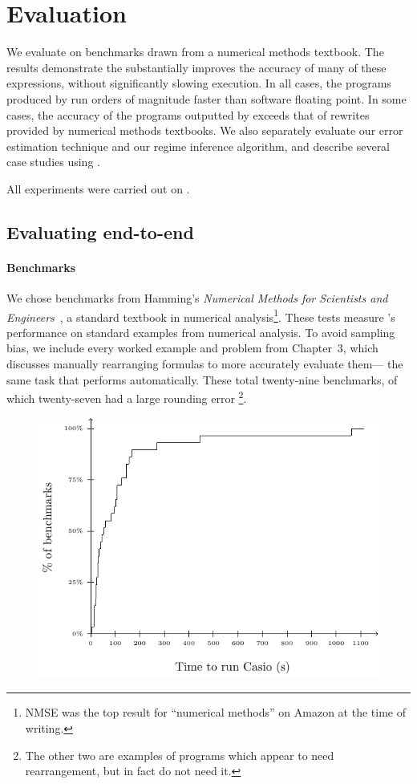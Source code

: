 \documentclass[paper.tex]{subfiles}
\begin{document}
\section{Evaluation}
\label{sec:evaluation}

We evaluate \casio on benchmarks drawn from a numerical methods
textbook.  The results demonstrate the \casio substantially improves
the accuracy of many of these expressions, without significantly
slowing execution.  In all cases, the programs produced by \casio run
orders of magnitude faster than software floating point.  In some
cases, the accuracy of the programs outputted by \casio exceeds that
of rewrites provided by numerical methods textbooks.  We also
separately evaluate our error estimation technique and our regime
inference algorithm, and describe several case studies using \casio.

All experiments were carried out on .

\subsection{Evaluating \casio end-to-end}

\paragraph{Benchmarks}
We chose benchmarks from Hamming's \emph{Numerical Methods for
  Scientists and Engineers}~\cite{book87-nmse}, a standard textbook in
numerical analysis\footnote{NMSE was the top result for ``numerical
  methods'' on Amazon at the time of writing.}.  These tests measure
\casio's performance on standard examples from numerical analysis.  To
avoid sampling bias, we include every worked example and problem from
Chapter~3, which discusses manually rearranging formulas to more
accurately evaluate them---%
the same task that \casio performs automatically.  These total
twenty-nine benchmarks, of which twenty-seven had a large rounding
error%
\footnote{The other two are examples of programs which appear to need
  rearrangement, but in fact do not need it.}.

\begin{figure}
\label{fig:eval-casio-time}
\includegraphics[width=0.9\columnwidth]{fig/eval-casio-time.pdf}
\caption{}
\end{figure}
\end{document}
